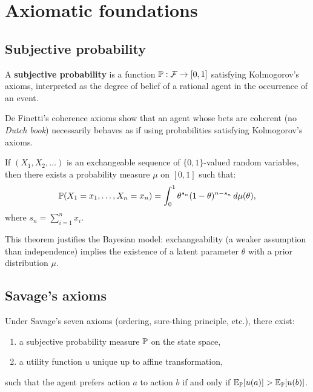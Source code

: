 \section{Axiomatic foundations}

\subsection{Subjective probability}

\begin{definition}
A \textbf{subjective probability} is a function
$\mathbb{P} : \mathcal{F} \to [0,1]$ satisfying Kolmogorov's axioms,
interpreted as the degree of belief of a rational agent in the
occurrence of an event.
\end{definition}

De Finetti's coherence axioms show that an agent whose bets are
coherent (no \textit{Dutch book}) necessarily behaves as if using
probabilities satisfying Kolmogorov's axioms.

\begin{theorem}
If $(X_1, X_2, \ldots)$ is an exchangeable sequence of $\{0,1\}$-valued
random variables, then there exists a probability measure $\mu$ on
$[0,1]$ such that:
\[
  \mathbb{P}(X_1 = x_1, \ldots, X_n = x_n)
  = \int_0^1 \theta^{s_n}(1-\theta)^{n - s_n}\,d\mu(\theta),
\]
where $s_n = \sum_{i=1}^n x_i$.
\end{theorem}

\begin{remark}
This theorem justifies the Bayesian model: exchangeability (a weaker
assumption than independence) implies the existence of a latent
parameter $\theta$ with a prior distribution $\mu$.
\end{remark}

\subsection{Savage's axioms}

\begin{theorem}
Under Savage's seven axioms (ordering, sure-thing principle, etc.),
there exist:
\begin{enumerate}
  \item a subjective probability measure $\mathbb{P}$ on the state space,
  \item a utility function $u$ unique up to affine transformation,
\end{enumerate}
such that the agent prefers action $a$ to action $b$ if and only if
$\mathbb{E}_{\mathbb{P}}[u(a)] > \mathbb{E}_{\mathbb{P}}[u(b)]$.
\end{theorem}

